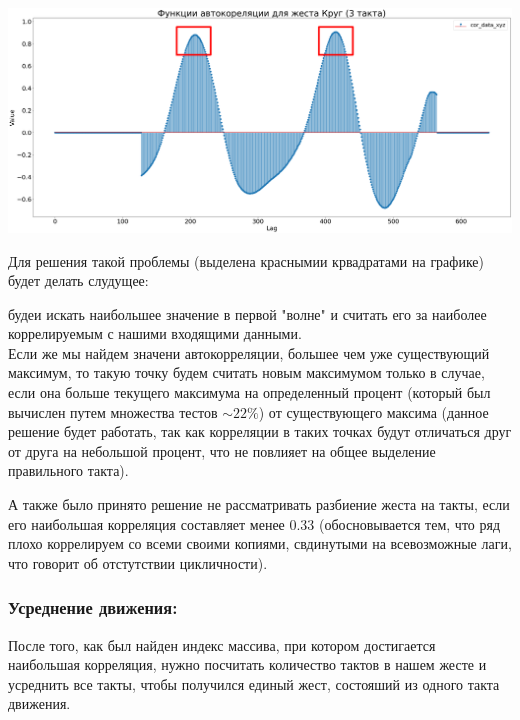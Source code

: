 \documentclass[a4paper]{article}
\begin{document}
\includegraphics[scale = 0.17]{cor_data_xyz_3_circle.png}

Для решения такой проблемы (выделена краснымии крвадратами на графике) будет делать слудущее:

будеи искать наибольшее значение в первой "волне" и считать его за наиболее коррелируемым с нашими входящими данными. \\
Если же мы найдем значени автокорреляции, большее чем уже существующий максимум, то такую точку будем считать новым максимумом только в случае, если она больше текущего максимума на определенный процент (который был вычислен путем множества тестов $\sim 22 \%$) от существующего максима (данное решение будет работать, так как корреляции в таких точках будут отличаться друг от друга на небольшой процент, что не повлияет на общее выделение правильного такта).

А также было принято решение не рассматривать разбиение жеста на такты, если его наибольшая корреляция составляет менее 0.33 (обосновывается тем, что ряд плохо коррелируем со всеми своими копиями, свдинутыми на всевозможные лаги, что говорит об отстутствии цикличности).

\subsubsection*{Усреднение движения:}
После того, как был найден индекс массива, при котором достигается наибольшая корреляция, нужно посчитать количество тактов в нашем жесте и усреднить все такты, чтобы получился единый жест, состояший из одного такта движения.
\end{document}
